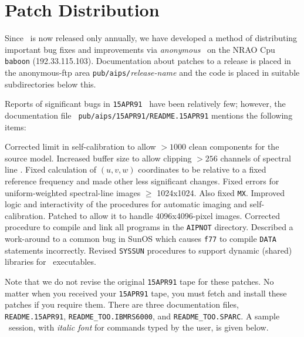 \section{Patch Distribution}
Since \AIPS\ is now released only annually, we have developed a method
of distributing important bug fixes and improvements via {\it
anonymous} \ftp\ on the NRAO Cpu {\tt baboon} (192.33.115.103).
Documentation about patches to a release is placed in the
anonymous-ftp area {\tt pub/aips/}{\it release-name} and the code is
placed in suitable subdirectories below this.

Reports of significant bugs in {\tt 15APR91} \AIPS\ have been
relatively few; however, the documentation file {\tt
pub/aips/15APR91/README.15APR91} mentions the following items:
\begin{description}
 Corrected limit in self-calibration to allow $> 1000$
   clean components for the source model.
 Increased buffer size to allow clipping $> 256$ channels
   of spectral line \uvdata.
 Fixed calculation of $(u,v,w)$ coordinates to be
   relative to a fixed reference frequency and made other less
   significant changes.
 Fixed errors for uniform-weighted spectral-line images
   $\geq$ 1024x1024.  Also fixed {\tt MX}.
 Improved logic and interactivity of the procedures for
   automatic imaging and self-calibration.
 Patched to allow it to handle 4096x4096-pixel images.
 Corrected procedure to compile and link all programs
   in the {\tt AIPNOT} directory.
 Described a work-around to a common bug in SunOS which
   causes {\tt f77} to compile {\tt DATA} statements incorrectly.
 Revised {\tt SYSSUN} procedures to support dynamic
   (shared) libraries for \AIPS\ executables.
\end{description}
Note that we do not revise the original {\tt 15APR91} tape for these
patches.  No matter when you received your {\tt 15APR91} tape, you
must fetch and install these patches if you require them.  There are
three documentation files, {\tt README.15APR91},
{\tt README\_TOO.IBMRS6000}, and \hbox{{\tt README\_TOO.SPARC}}.  A
sample \ftp\ session, with {\it italic font} for commands typed by the
user, is given below.

